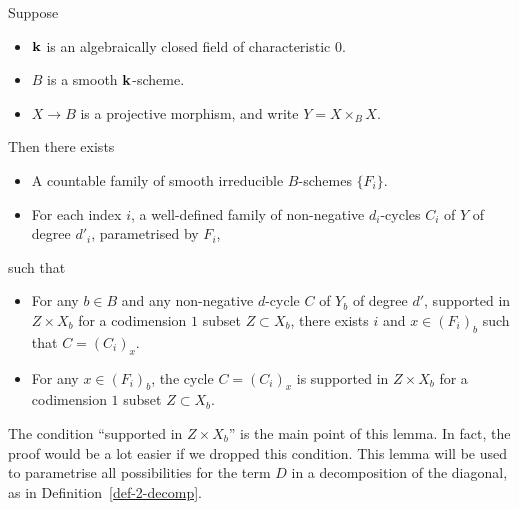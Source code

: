 \begin{lemma} \label{lem-3-all-cycles}
    Suppose
    \begin{itemize}
        \item
            $\bbk$ is an algebraically closed field of characteristic $0$.
        \item
            $B$ is a smooth $\bbk$-scheme.
        \item
            $X \to B$ is a projective morphism, and write $Y = X \times_B X$.
    \end{itemize}
    Then there exists
    \begin{itemize}
        \item
            A countable family of smooth irreducible $B$-schemes $\{ F_i \}$.
        \item
            For each index $i$, a well-defined family of non-negative
            $d_i$-cycles $C_i$ of $Y$ of degree $d'_i$,
            parametrised by $F_i$,
    \end{itemize}
    such that
    \begin{itemize}
        \item
            For any $b \in B$ and any non-negative $d$-cycle $C$ of $Y_b$ of degree $d'$,
            supported in $Z \times X_b$ for a codimension $1$ subset $Z \subset X_b$,
            there exists $i$ and $x \in (F_i)_b$ such that $C = (C_i)_x$.
        \item
            For any $x \in (F_i)_b$,
            the cycle $C = (C_i)_x$ is supported in $Z \times X_b$
            for a codimension $1$ subset $Z \subset X_b$.
    \end{itemize}
\end{lemma}

The condition ``supported in $Z \times X_b$'' is the main point of this lemma.
In fact, the proof would be a lot easier if we dropped this condition.
This lemma will be used to parametrise all possibilities for
the term $D$ in a decomposition of the diagonal, as in Definition~\ref{def-2-decomp}.

